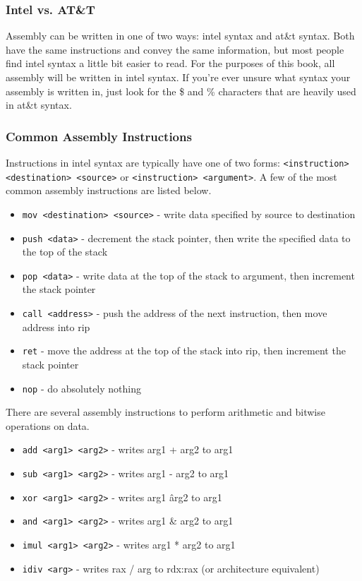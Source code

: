 \subsubsection{Intel vs. AT\&T}
Assembly can be written in one of two ways: intel syntax and at\&t syntax. Both
have the same instructions and convey the same information, but most people find
intel syntax a little bit easier to read. For the purposes of this book, all
assembly will be written in intel syntax. If you're ever unsure what syntax your
assembly is written in, just look for the \$ and \% characters that are heavily
used in at\&t syntax.

\subsubsection{Common Assembly Instructions}
Instructions in intel syntax are typically have one of two forms:
\texttt{<instruction> <destination> <source>} or \texttt{<instruction>
<argument>}. A few of the most common assembly instructions are listed below.

\begin{itemize}
    \item \texttt{mov <destination> <source>} - write data specified by source
        to destination
    \item \texttt{push <data>} - decrement the stack pointer, then write the
        specified data to the top of the stack
    \item \texttt{pop <data>} - write data at the top of the stack to argument,
        then increment the stack pointer
    \item \texttt{call <address>} - push the address of the next instruction,
        then move address into rip
    \item \texttt{ret} - move the address at the top of the stack into rip,
        then increment the stack pointer
    \item \texttt{nop} - do absolutely nothing
\end{itemize}

There are several assembly instructions to perform arithmetic and bitwise
operations on data.

\begin{itemize}
    \item \texttt{add <arg1> <arg2>} - writes arg1 + arg2 to arg1
    \item \texttt{sub <arg1> <arg2>} - writes arg1 - arg2 to arg1
    \item \texttt{xor <arg1> <arg2>} - writes arg1 \^ arg2 to arg1
    \item \texttt{and <arg1> <arg2>} - writes arg1 \& arg2 to arg1
    \item \texttt{imul <arg1> <arg2>} - writes arg1 * arg2 to arg1
    \item \texttt{idiv <arg>} - writes rax / arg to rdx:rax (or architecture
        equivalent)
\end{itemize}

